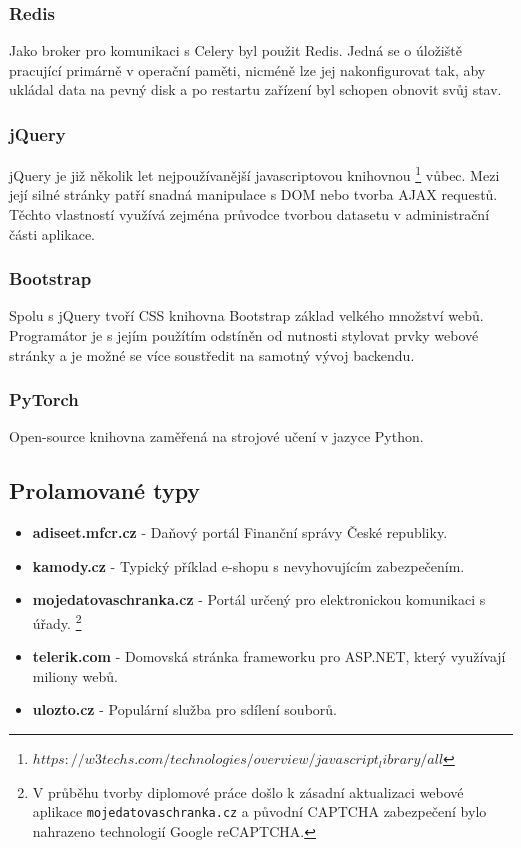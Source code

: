 \documentclass[
  master=true,
  biblatex,
  glossaries,
  index
]{kidiplom}
\begin{document}
\subsubsection*{Redis}
Jako broker pro komunikaci s Celery byl použit Redis. Jedná se o úložiště pracující primárně v operační paměti, nicméně lze jej nakonfigurovat tak, aby ukládal data na pevný disk a po restartu zařízení byl schopen obnovit svůj stav.

\subsubsection*{jQuery}
jQuery je již několik let nejpoužívanější javascriptovou knihovnou \footnote{$https://w3techs.com/technologies/overview/javascript_library/all$} vůbec. Mezi její silné stránky patří snadná manipulace s DOM nebo tvorba AJAX requestů. Těchto vlastností využívá zejména průvodce tvorbou datasetu v administrační části aplikace.
\subsubsection*{Bootstrap}
Spolu s jQuery tvoří CSS knihovna Bootstrap základ velkého množství webů. Programátor je s jejím použítím odstíněn od nutnosti stylovat prvky webové stránky a je možné se více soustředit na samotný vývoj backendu.
\subsubsection*{PyTorch}
Open-source knihovna zaměřená na strojové učení v jazyce Python. 


\subsection{Prolamované typy}
 
\begin{itemize}
	\item \textbf{adiseet.mfcr.cz} - Daňový portál Finanční správy České republiky. 
	\item \textbf{kamody.cz} - Typický příklad e-shopu s nevyhovujícím zabezpečením.
	\item \textbf{mojedatovaschranka.cz} - Portál určený pro elektronickou komunikaci s úřady. \footnote{V průběhu tvorby diplomové práce došlo k zásadní aktualizaci webové aplikace \texttt{mojedatovaschranka.cz} a původní CAPTCHA zabezpečení bylo nahrazeno technologií Google reCAPTCHA.}
	\item \textbf{telerik.com} - Domovská stránka frameworku pro ASP.NET, který využívají miliony webů.
	\item \textbf{ulozto.cz} - Populární služba pro sdílení souborů.
\end{itemize}
\end{document}
